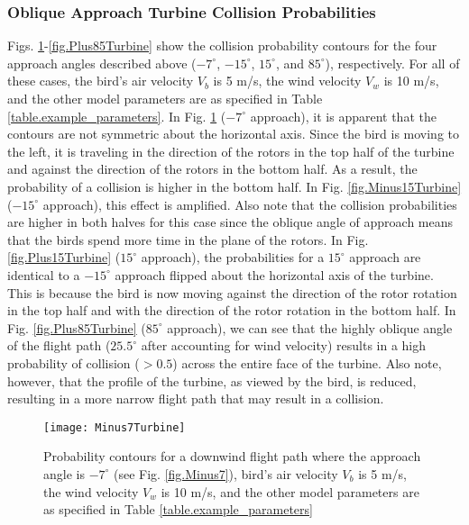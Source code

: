 \label{} \documentclass[10pt,conference]{IEEEtran}
\begin{document}
\subsubsection{Oblique Approach Turbine Collision Probabilities}
Figs. \ref{fig.Minus7Turbine}-\ref{fig.Plus85Turbine} show the collision probability contours for the four approach
angles described above ($-7^\circ$, $-15^\circ$, $15^\circ$, and $85^\circ$), respectively. For all of these cases, the
bird's air velocity $V_b$ is 5 m/s, the wind velocity $V_w$ is 10 m/s, and the other model parameters are as specified
in Table \ref{table.example_parameters}. In Fig. \ref{fig.Minus7Turbine} ($-7^\circ$ approach), it is apparent that the
contours are not symmetric about the horizontal axis. Since the bird is moving to the left, it is traveling in the
direction of the rotors in the top half of the turbine and against the direction of the rotors in the bottom half. As a
result, the probability of a collision is higher in the bottom half. In Fig. \ref{fig.Minus15Turbine} ($-15^\circ$
approach), this effect is amplified. Also note that the collision probabilities are higher in both halves for this case
since the oblique angle of approach means that the birds spend more time in the plane of the rotors. In Fig.
\ref{fig.Plus15Turbine} ($15^\circ$ approach), the probabilities for a $15^\circ$ approach are identical to a
$-15^\circ$ approach flipped about the horizontal axis of the turbine. This is because the bird is now moving against
the direction of the rotor rotation in the top half and with the direction of the rotor rotation in the bottom half. In
Fig. \ref{fig.Plus85Turbine} ($85^\circ$ approach), we can see that the highly oblique angle of the flight path
($25.5^\circ$ after accounting for wind velocity) results in a high probability of collision ($>0.5$) across the entire
face of the turbine. Also note, however, that the profile of the turbine, as viewed by the bird, is reduced, resulting
in a more narrow flight path that may result in a collision.

\begin{figure}
   \centering
   \texttt{[image: Minus7Turbine]}
   \caption{Probability contours for a downwind flight path where the approach angle is $-7^\circ$ (see Fig. \ref{fig.Minus7}), bird's air velocity $V_b$ is 5
m/s, the wind velocity $V_w$ is 10 m/s, and the other model parameters are as specified in Table
\ref{table.example_parameters}}
   \label{fig.Minus7Turbine}
   \end{figure}
\end{document}
